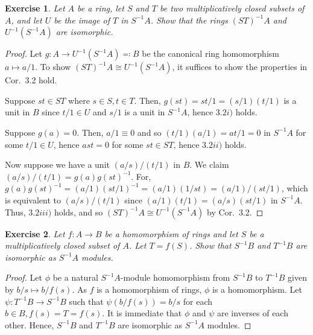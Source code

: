 \documentclass[12pt,letterpaper]{article}
\newtheorem{problem}{Exercise}[section]
\theoremstyle{definition}
\theoremstyle{remark}
\numberwithin{figure}{problem}
\numberwithin{equation}{section}
\begin{document}
\begin{problem}
  Let $A$ be a ring, let $S$ and $T$ be two multiplicatively closed subsets of
  $A$, and let $U$ be the image of $T$ in $S^{-1}A$.
  Show that the rings $(ST)^{-1}A$ and $U^{-1}(S^{-1}A)$ are isomorphic.
\end{problem}
\begin{proof}
  Let $g\colon A \to U^{-1}(S^{-1}A) \eqqcolon B$ be the canonical ring
  homomorphism $a \mapsto a/1$.
  To show $(ST)^{-1}A \cong U^{-1}(S^{-1}A)$, it suffices to show the
  properties in Cor.~3.2 hold.
  \par Suppose $st \in ST$ where $s\in S,t\in T$.
  Then, $g(st) = st/1 = (s/1)(t/1)$ is a unit in $B$ since
  $t/1 \in U$ and $s/1$ is a unit in $S^{-1}A$, hence $3.2i)$ holds.
  \par Suppose $g(a) = 0$. Then, $a/1 \equiv 0$ and so $(t/1)(a/1) = at/1 = 0$ in
  $S^{-1}A$ for some $t/1 \in U$, hence $ast = 0$ for some $st \in ST$,
  hence $3.2ii)$ holds.
  \par Now suppose we have a unit $(a/s)/(t/1)$ in $B$. We claim $(a/s)/(t/1) =
  g(a)g(st)^{-1}$. For, $g(a)g(st)^{-1} = (a/1)(st/1)^{-1} = (a/1)(1/st) =
  (a/1)/(st/1)$, which is equivalent to $(a/s)/(t/1)$ since $(a/1)(t/1) =
  (a/s)(st/1)$ in $S^{-1}A$.
  Thus, $3.2iii)$ holds, and so $(ST)^{-1}A \cong U^{-1}(S^{-1}A)$ by Cor.~3.2.
\end{proof}

\begin{problem}
  Let $f\colon A \to B$ be a homomorphism of rings and let $S$ be a multiplicatively closed subset of $A$. Let $T= f(S)$. Show that $S^{-1}B$ and $T^{-1}B$ are isomorphic as $S^{-1}A$ modules. 
\end{problem}
\begin{proof}
Let $\phi$ be a natural $S^{-1}A$-module homomorphism from $S^{-1}B$ to $T^{-1}B$ given by $b/s \mapsto b/f(s)$. As $f$ is a homomorphism of rings, $\phi$ is a homomorphism. Let $\psi: T^{-1}B\to S^{-1}B$ such that $\psi(b/f(s)) = b/s$ for each $b \in B, f(s) = T = f(s)$. It is immediate that $\phi$ and $\psi$ are inverses of each other. Hence, $S^{-1}B$ and $T^{-1}B$ are isomorphic as $S^{-1}A$ modules. 
\end{proof}
\end{document}
